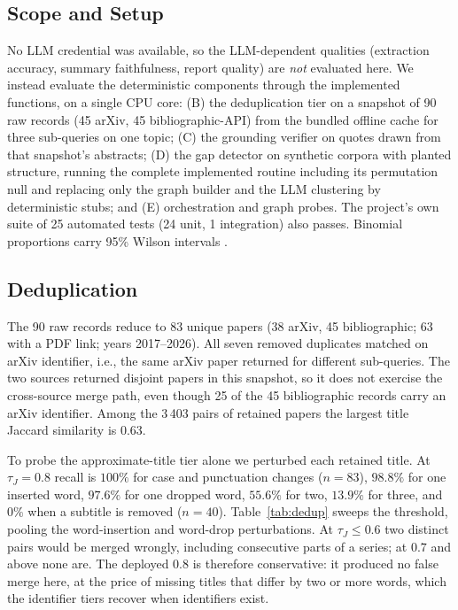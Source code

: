 \documentclass[conference]{IEEEtran}
\begin{document}
\subsection{Scope and Setup}
No LLM credential was available, so the LLM-dependent qualities (extraction accuracy, summary faithfulness, report quality) are \emph{not} evaluated here. We instead evaluate the deterministic components through the implemented functions, on a single CPU core: (B) the deduplication tier on a snapshot of 90 raw records (45 arXiv, 45 bibliographic-API) from the bundled offline cache for three sub-queries on one topic; (C) the grounding verifier on quotes drawn from that snapshot's abstracts; (D) the gap detector on synthetic corpora with planted structure, running the complete implemented routine including its permutation null and replacing only the graph builder and the LLM clustering by deterministic stubs; and (E) orchestration and graph probes. The project's own suite of 25 automated tests (24 unit, 1 integration) also passes. Binomial proportions carry 95\% Wilson intervals \cite{wilson1927}.

\subsection{Deduplication}
The 90 raw records reduce to 83 unique papers (38 arXiv, 45 bibliographic; 63 with a PDF link; years 2017--2026). All seven removed duplicates matched on arXiv identifier, i.e., the same arXiv paper returned for different sub-queries. The two sources returned disjoint papers in this snapshot, so it does not exercise the cross-source merge path, even though 25 of the 45 bibliographic records carry an arXiv identifier. Among the 3\,403 pairs of retained papers the largest title Jaccard similarity is 0.63.

To probe the approximate-title tier alone we perturbed each retained title. At $\tau_J=0.8$ recall is $100\%$ for case and punctuation changes ($n{=}83$), $98.8\%$ for one inserted word, $97.6\%$ for one dropped word, $55.6\%$ for two, $13.9\%$ for three, and $0\%$ when a subtitle is removed ($n{=}40$). Table~\ref{tab:dedup} sweeps the threshold, pooling the word-insertion and word-drop perturbations. At $\tau_J\le0.6$ two distinct pairs would be merged wrongly, including consecutive parts of a series; at $0.7$ and above none are. The deployed $0.8$ is therefore conservative: it produced no false merge here, at the price of missing titles that differ by two or more words, which the identifier tiers recover when identifiers exist.
\end{document}
